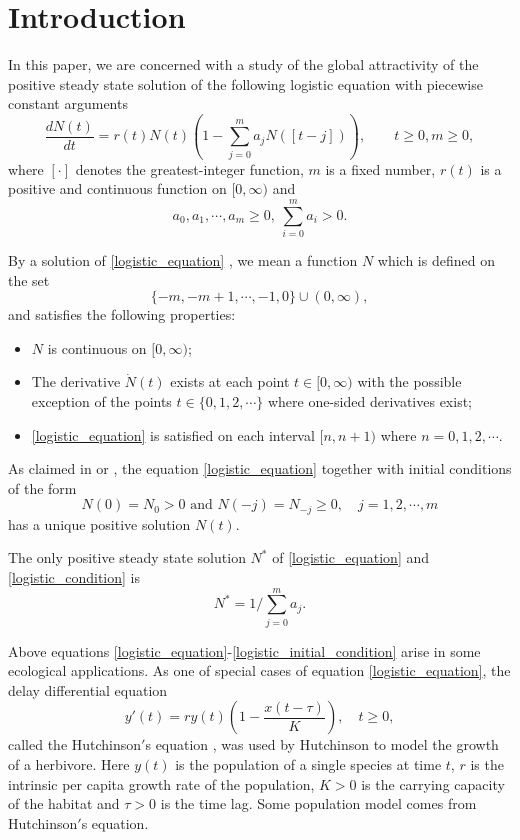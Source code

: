 \documentclass{HZNUMCM}
\begin{document}
\showSummarySheet
\showContents

\section{Introduction}
In this paper, we are concerned with a  study of the global attractivity of the positive steady state  solution of  the following logistic equation with piecewise constant arguments
\begin{equation}\label{logistic_equation}
\frac{dN(t)}{dt}=r(t)N(t)\left(1-\sum_{j=0}^{m}a_jN([t-j])\right),\qquad t\geqslant 0,m\geqslant0,
\end{equation}
where $[\cdot]$ denotes the greatest-integer function, $m$ is a fixed number,  $r(t)$ is a positive and continuous function on $[0,\infty)$  and
\begin{equation}\label{logistic_condition}
a_0,a_1,\cdots,a_{m}\geqslant 0, ~\sum_{i=0}^ma_i>0.
\end{equation}

By a solution of \eqref{logistic_equation} , we mean a function $N$ which is defined on the set
$$
\{-m,-m+1,\cdots,-1,0\}\cup(0,\infty),
$$ and satisfies the following properties:
\begin{itemize}
\item $N$ is continuous on $[0,\infty)$;
\item The derivative $\dot N(t)$ exists at each point $t\in [0,\infty)$ with the possible exception of the points $t\in\{0,1,2,\cdots\}$ where one-sided derivatives exist;
\item \eqref{logistic_equation} is satisfied on each interval $[n,n+1)$ where $n=0,1,2,\cdots$.
\end{itemize}

As claimed in  \cite{1995_so_R1339824} or \cite{1991_gopalsamy_MR1079622}, the equation \eqref{logistic_equation} together with initial conditions of the form
\begin{equation}\label{logistic_initial_condition}
N(0)=N_0>0 \text{~and~} N(-j)=N_{-j}\geqslant 0,\quad j=1,2,\cdots,m
\end{equation}
has a unique positive solution $N(t)$.


The only  positive steady state solution $N^*$ of \eqref{logistic_equation} and \eqref{logistic_condition} is
$$
N^*=1/\sum_{j=0}^ma_j.
$$



Above equations \eqref{logistic_equation}-\eqref{logistic_initial_condition} arise in some ecological applications. As one of special cases of equation \eqref{logistic_equation}, the delay differential equation
$$
y'(t)=r y(t) \left(1-\frac{x(t-\tau)}K\right),\quad t\geqslant 0,
$$
called the Hutchinson$'$s  equation \cite{NYAS:NYAS221}, was used by Hutchinson  to model the growth of a herbivore. Here $y(t)$ is the population of a single species at time $t$, $r$ is the intrinsic per capita growth rate of the population, $K>0$ is the carrying capacity of the habitat and $\tau>0$ is the time lag.  Some population model comes from Hutchinson$'$s equation.
\end{document}
